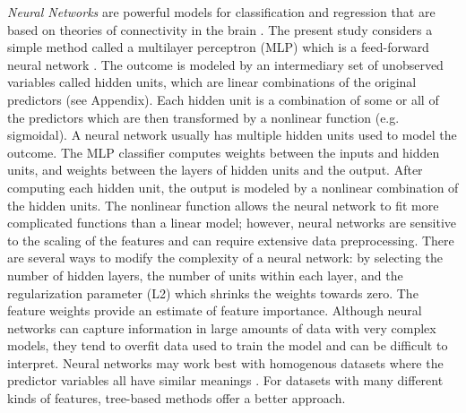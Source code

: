 \documentclass[sigconf]{acmart}
\begin{document}
\emph{Neural Networks} are powerful models for classification and regression 
that are based on theories of connectivity in the brain \cite{kuhn13}. 
The present study considers a simple method called a multilayer perceptron 
(MLP) which is a feed-forward neural network \cite{muller17, raschka17}. 
The outcome is modeled by an intermediary set of unobserved variables called 
hidden units, which are linear combinations of the original predictors
(see Appendix). Each hidden unit is a combination of some or all of the 
predictors which are then transformed by a nonlinear function (e.g. 
sigmoidal). A neural network usually has multiple hidden units used 
to model the outcome. The MLP classifier computes weights between the inputs 
and hidden units, and weights between the layers of hidden units and the 
output. After computing each hidden unit, the output is modeled by a nonlinear 
combination of the hidden units. The nonlinear function allows the neural 
network to fit more complicated functions than a linear model; however, 
neural networks are sensitive to the scaling of the features and can require
extensive data preprocessing. There are several ways to modify the complexity 
of a neural network: by selecting the number of hidden layers, the number of 
units within each layer, and the regularization parameter (L2) which shrinks 
the weights towards zero. The feature weights provide an estimate of feature 
importance. Although neural networks can capture information in large amounts 
of data with very complex models, they tend to overfit data used to train the 
model and can be difficult to interpret. Neural networks may work best with 
homogenous datasets where the predictor variables all have similar meanings 
\cite{muhuri13}. For datasets with many different kinds of features, 
tree-based methods offer a better approach.

\end{document}
